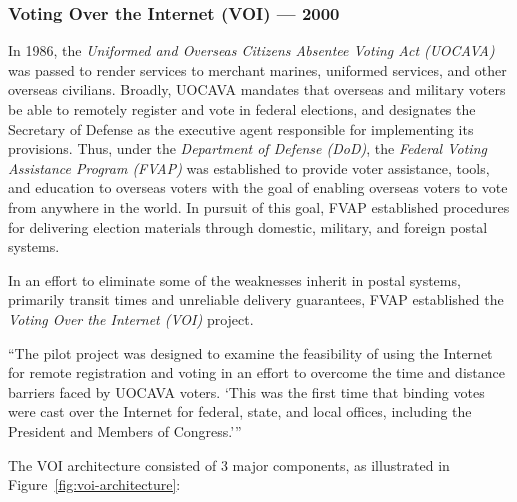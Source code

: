 \subsubsection{Voting Over the Internet (VOI) --- 2000}

In 1986, the \emph{Uniformed and Overseas Citizens Absentee Voting Act (UOCAVA)}
was passed to render services to merchant marines, uniformed services, and other
overseas civilians. Broadly, UOCAVA mandates that overseas and military
voters be able to remotely register and vote in federal elections, and
designates the Secretary of Defense as the executive agent responsible for
implementing its provisions. Thus, under the \emph{Department of Defense
(DoD)}, the \emph{Federal Voting Assistance Program (FVAP)} was established  to
provide voter assistance, tools, and education to overseas voters with the goal
of enabling overseas voters to vote from anywhere in the world. In pursuit of
this goal, FVAP established procedures for delivering election materials through
domestic, military, and foreign postal systems.

In an effort to eliminate some of the weaknesses inherit in postal systems,
primarily transit times and unreliable delivery guarantees, FVAP established the
\emph{Voting Over the Internet (VOI)} project.

\begin{displayquote}
  ``The pilot project was designed to examine the feasibility of using the
  Internet for remote registration and voting in an effort to overcome the time
  and distance barriers faced by UOCAVA voters. `This was the first time that
  binding votes were cast over the Internet for federal, state, and local
  offices, including the President and Members of
  Congress.'{}''\cite{internet-voting-survey,voi-assessment-report}
\end{displayquote}

The VOI architecture consisted of 3 major components, as illustrated in
Figure~\ref{fig:voi-architecture}:


